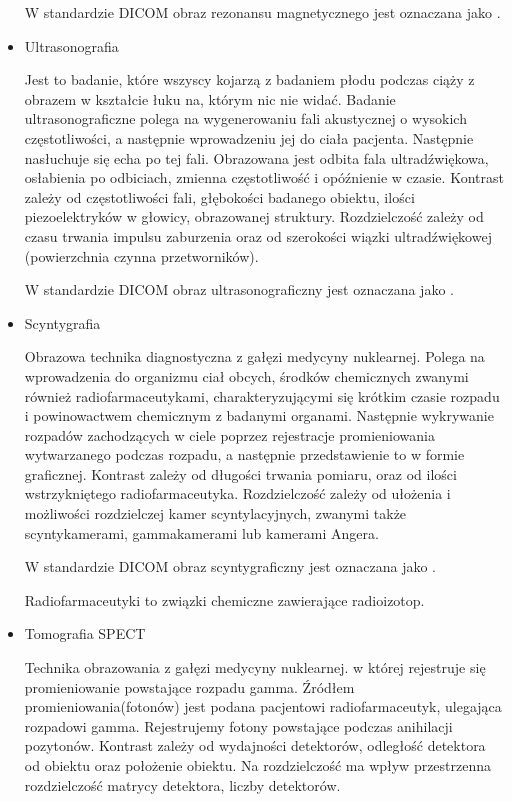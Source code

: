 \begin{itemize}
    W standardzie DICOM obraz rezonansu magnetycznego jest oznaczana jako .
    
    \item Ultrasonografia
    
    Jest to badanie, które wszyscy kojarzą z badaniem płodu podczas ciąży z obrazem w kształcie łuku na, którym nic nie widać.
    Badanie ultrasonograficzne polega na wygenerowaniu fali akustycznej o wysokich częstotliwości, a następnie wprowadzeniu jej do ciała pacjenta.
    Następnie nasłuchuje się echa po tej fali.
    Obrazowana jest odbita fala ultradźwiękowa, osłabienia po odbiciach, zmienna częstotliwość i opóźnienie w czasie.
    Kontrast zależy od częstotliwości fali, głębokości badanego obiektu, ilości piezoelektryków w głowicy, obrazowanej struktury.
    Rozdzielczość zależy od czasu trwania impulsu zaburzenia oraz od szerokości wiązki ultradźwiękowej (powierzchnia czynna przetworników).

    W standardzie DICOM obraz ultrasonograficzny jest oznaczana jako .

    \item Scyntygrafia
    
    Obrazowa technika diagnostyczna z gałęzi medycyny nuklearnej.
    Polega na wprowadzenia do organizmu ciał obcych, środków chemicznych zwanymi również radiofarmaceutykami, charakteryzującymi się krótkim czasie rozpadu i powinowactwem chemicznym z badanymi organami.
    Następnie wykrywanie rozpadów zachodzących w ciele poprzez rejestracje promieniowania wytwarzanego podczas rozpadu, a następnie przedstawienie to w formie graficznej.
    Kontrast zależy od długości trwania pomiaru, oraz od ilości wstrzykniętego radiofarmaceutyka.
    Rozdzielczość zależy od ułożenia i możliwości rozdzielczej kamer scyntylacyjnych, zwanymi także scyntykamerami, gammakamerami lub kamerami Angera.

    W standardzie DICOM obraz scyntygraficzny jest oznaczana jako .

    Radiofarmaceutyki to związki chemiczne zawierające radioizotop.

    \item Tomografia SPECT
    
    Technika obrazowania  z gałęzi medycyny nuklearnej. w której rejestruje się promieniowanie powstające rozpadu gamma.
    Źródłem promieniowania(fotonów) jest podana pacjentowi radiofarmaceutyk, ulegająca rozpadowi gamma.
    Rejestrujemy fotony powstające podczas anihilacji pozytonów.
    Kontrast zależy od wydajności detektorów, odległość detektora od obiektu oraz położenie obiektu.
    Na rozdzielczość ma wpływ przestrzenna rozdzielczość matrycy detektora, liczby detektorów.


\end{itemize}
